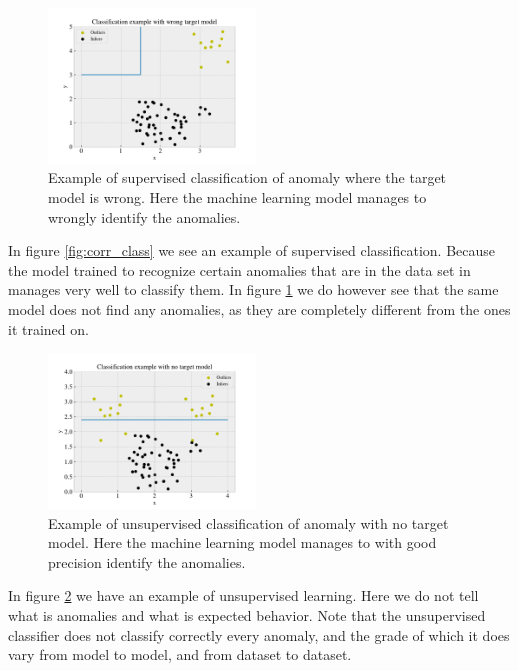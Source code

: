 \documentclass[ reprint, amsmath,amssymb, aps, nofootinbib]{revtex4-2}
\begin{document}
\begin{figure}[H]
    \centering
    \includegraphics[width=0.49\textwidth]{figures/theory/wrong_class.pdf}
    \caption{Example of supervised classification of anomaly where the target model is wrong. Here the machine learning model manages to wrongly identify the anomalies. }
    \label{fig:wrong_class}
\end{figure}

In figure \ref{fig:corr_class} we see an example of supervised classification. Because the model trained to recognize certain anomalies that are in the data set in manages very well to classify them. In figure \ref{fig:wrong_class} we do however see that the same model does not find any anomalies, as they are completely different from the ones it trained on. 

\begin{figure}[H]
    \centering
    \includegraphics[width=0.49\textwidth]{figures/theory/unsuper.pdf}
    \caption{Example of unsupervised classification of anomaly with no target model. Here the machine learning model manages to with good precision identify the anomalies. }
    \label{fig:unsup_class}
\end{figure}

In figure \ref{fig:unsup_class} we have an example of unsupervised learning. Here we do not tell what is anomalies and what is expected behavior. Note that the unsupervised classifier does not classify correctly every anomaly, and the grade of which it does vary from model to model, and from dataset to dataset. \par \par 
\end{document}
